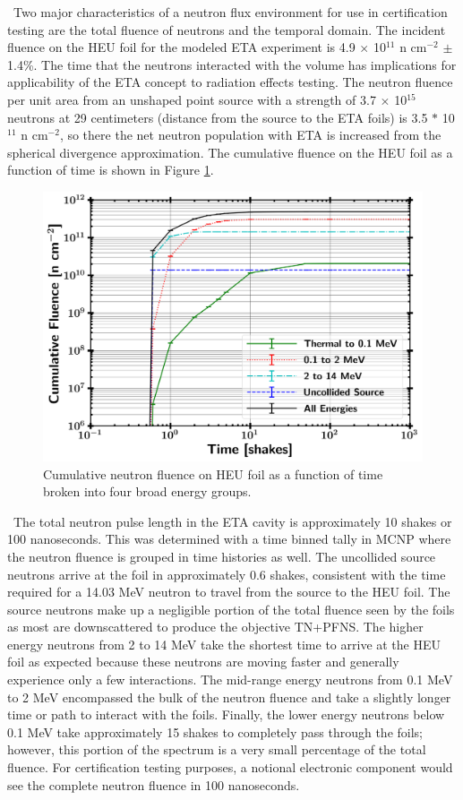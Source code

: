 \ Two major characteristics of a neutron flux environment for use in certification testing are the total fluence of neutrons and the temporal domain. 
The incident fluence on the HEU foil for the modeled ETA experiment is 4.9 $\times$ 10$^{11}$ n cm$^{-2}$ $\pm$ 1.4\%. 
The time that the neutrons interacted with the volume has implications for applicability of the ETA concept to radiation effects testing. 
The neutron fluence per unit area from an unshaped point source with a strength of 3.7 $\times$ 10$^{15}$ neutrons at 29 centimeters (distance from the source to the ETA foils) is 3.5 $*$ 10$^{11}$ n cm$^{-2}$, so there the net neutron population with ETA is increased from the spherical divergence approximation.
The cumulative fluence on the HEU foil as a function of time is shown in Figure \ref{fig:timing1}. 

\begin{figure}[!htbp]
	\centering
	\includegraphics[width=13cm]{Figures/Chapter4/NeutronFlux/U_Fluence_timing.png}
	\caption{Cumulative neutron fluence on HEU foil as a function of time broken into four broad energy groups.}
	\label{fig:timing1}
\end{figure}

\ The total neutron pulse length in the ETA cavity is approximately 10 shakes or 100 nanoseconds. This was determined with a time binned tally in MCNP where the neutron fluence is grouped in time histories as well.  
The uncollided source neutrons arrive at the foil in approximately 0.6 shakes, consistent with the time required for a 14.03 MeV neutron to travel from the source to the HEU foil. 
The source neutrons make up a negligible portion of the total fluence seen by the foils as most are downscattered to produce the objective TN+PFNS. 
The higher energy neutrons from 2 to 14 MeV take the shortest time to arrive at the HEU foil as expected because these neutrons are moving faster and generally experience only a few interactions. 
The mid-range energy neutrons from 0.1 MeV to 2 MeV encompassed the bulk of the neutron fluence and take a slightly longer time or path to interact with the foils. 
Finally, the lower energy neutrons below 0.1 MeV take approximately 15 shakes to completely pass through the foils; however, this portion of the spectrum is a very small percentage of the total fluence. 
For certification testing purposes, a notional electronic component would see the complete neutron fluence in 100 nanoseconds. 

